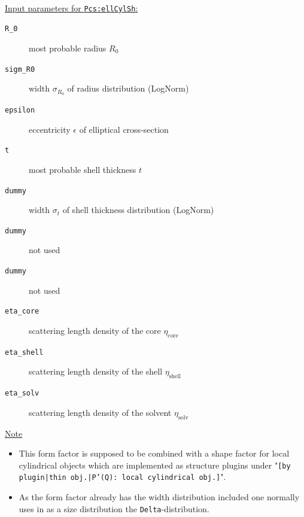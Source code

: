 \vspace{5mm}

\hspace{1pt}\\
\uline{Input parameters for \texttt{Pcs:ellCylSh}:}
\begin{description}
    \item[\texttt{R\_0}] most probable radius $R_0$
    \item[\texttt{sigm\_R0}] width $\sigma_{R_0}$ of radius distribution (LogNorm)
    \item[\texttt{epsilon}] eccentricity $\epsilon$ of elliptical cross-section
    \item[\texttt{t}] most probable shell thickness $t$
    \item[\texttt{dummy}] width $\sigma_t$ of shell thickness distribution (LogNorm)
    \item[\texttt{dummy}] not used
    \item[\texttt{dummy}] not used
    \item[\texttt{eta\_core}] scattering length density of the core $\eta_\textrm{core}$
    \item[\texttt{eta\_shell}] scattering length density of the shell $\eta_\textrm{shell}$
    \item[\texttt{eta\_solv}] scattering length density of the solvent $\eta_\textrm{solv}$
\end{description}

\noindent
\uline{Note}
\begin{itemize}
  \item This form factor is supposed to be combined with a shape factor for
local cylindrical objects which are implemented as structure  plugins
under "\texttt{[by plugin|thin obj.|P'(Q): local cylindrical obj.]}".
\item As the form factor already has the width distribution included one normally uses in \SASfit as a size distribution
the \texttt{Delta}-distribution.
\end{itemize}

